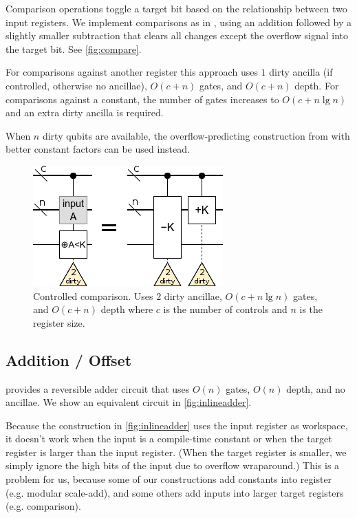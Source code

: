 \documentclass[twocolumn,longbibliography]{quantumarticle-customized}
\begin{document}
Comparison operations toggle a target bit based on the relationship between two input registers.
We implement comparisons as in \cite{takahashi2005}, using an addition followed by a slightly smaller subtraction that clears all changes except the overflow signal into the target bit.
See \autoref{fig:compare}.

For comparisons against another register this approach uses $1$ dirty ancilla (if controlled, otherwise no ancillae), $O(c + n)$ gates, and $O(c + n)$ depth.
For comparisons against a constant, the number of gates increases to $O(c + n \lg n)$ and an extra dirty ancilla is required.

When $n$ dirty qubits are available, the overflow-predicting construction from \cite{haner2016} with better constant factors can be used instead.


\begin{figure}
  \centering
  \includegraphics[width=\linewidth]{assets/comparison-less-const.png}
  \caption{
    Controlled comparison.
    Uses $2$ dirty ancillae, $O(c + n \lg n)$ gates, and $O(c + n)$ depth where $c$ is the number of controls and $n$ is the register size.
  }
  \label{fig:compare}
\end{figure}


\subsection{Addition / Offset}

\cite{takahashi2005} provides a reversible adder circuit that uses $O(n)$ gates, $O(n)$ depth, and no ancillae.
We show an equivalent circuit in \autoref{fig:inlineadder}.

Because the construction in \autoref{fig:inlineadder} uses the input register as workspace, it doesn't work when the input is a compile-time constant or when the target register is larger than the input register.
(When the target register is smaller, we simply ignore the high bits of the input due to overflow wraparound.)
This is a problem for us, because some of our constructions add constants into register (e.g. modular scale-add), and some others add inputs into larger target registers (e.g. comparison).
\end{document}

